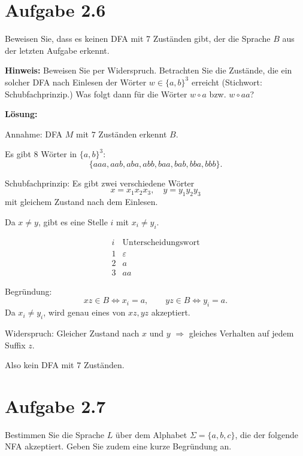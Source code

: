\documentclass[a4paper,12pt]{article}
\begin{document}
\section*{Aufgabe 2.6}

Beweisen Sie, dass es keinen DFA mit 7 Zuständen gibt, der die Sprache $B$ aus der letzten Aufgabe erkennt.

\medskip
\textbf{Hinweis:} Beweisen Sie per Widerspruch. Betrachten Sie die Zustände, die ein solcher DFA nach Einlesen der Wörter $w \in \{a,b\}^3$ erreicht (Stichwort: Schubfachprinzip.) Was folgt dann für die Wörter $w \circ a$ bzw. $w \circ aa$?

\medskip
\textbf{Lösung:}

Annahme: DFA $M$ mit $7$ Zuständen erkennt $B$.

Es gibt $8$ Wörter in $\{a,b\}^3$:
\[
\{aaa,aab,aba,abb,baa,bab,bba,bbb\}.
\]

Schubfachprinzip: Es gibt zwei verschiedene Wörter
\[
x=x_1x_2x_3,\quad y=y_1y_2y_3
\]
mit gleichem Zustand nach dem Einlesen.

Da $x\neq y$, gibt es eine Stelle $i$ mit $x_i\neq y_i$.

\[
\begin{array}{c|c}
i & \text{Unterscheidungswort}\\ \hline
1 & \varepsilon\\
2 & a\\
3 & aa
\end{array}
\]

Begründung:
\[
xz\in B \Longleftrightarrow x_i=a,
\qquad
yz\in B \Longleftrightarrow y_i=a.
\]
Da $x_i\neq y_i$, wird genau eines von $xz,yz$ akzeptiert.

Widerspruch: Gleicher Zustand nach $x$ und $y$ $\Rightarrow$ gleiches Verhalten auf jedem Suffix $z$.

Also kein DFA mit $7$ Zuständen.

\section*{Aufgabe 2.7}

Bestimmen Sie die Sprache $L$ über dem Alphabet $\Sigma = \{a,b,c\}$, die der folgende NFA akzeptiert. Geben Sie zudem eine kurze Begründung an.
\end{document}
